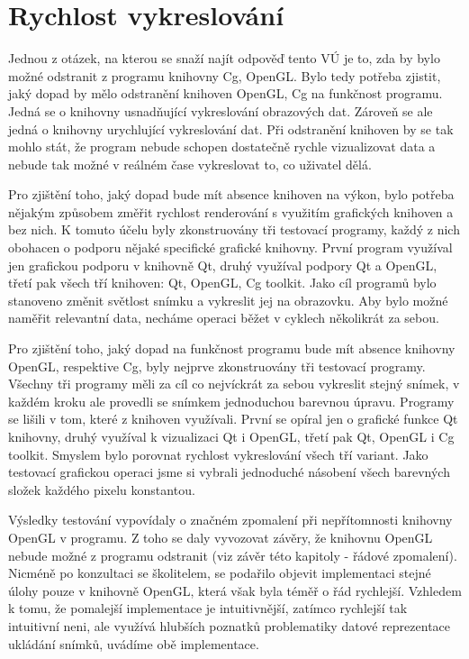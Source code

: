 \section{Rychlost vykreslování}
Jednou z otázek, na kterou se snaží najít odpověď tento VÚ je to, zda by bylo možné odstranit z programu knihovny Cg, OpenGL. Bylo tedy potřeba zjistit, jaký dopad by mělo odstranění knihoven OpenGL, Cg na funkčnost programu. Jedná se o knihovny usnadňující vykreslování obrazových dat. Zároveň se ale jedná o knihovny urychlující vykreslování dat. Při odstranění knihoven by se tak mohlo stát, že program nebude schopen dostatečně rychle vizualizovat data a nebude tak možné v reálném čase vykreslovat to, co uživatel dělá.

Pro zjištění toho, jaký dopad bude mít absence knihoven na výkon, bylo potřeba nějakým způsobem změřit rychlost renderování s využitím grafických knihoven a bez nich. K tomuto účelu byly zkonstruovány tři testovací programy, každý z nich obohacen o podporu nějaké specifické grafické knihovny. První program využíval jen grafickou podporu v knihovně Qt, druhý využíval podpory Qt a OpenGL, třetí pak všech tří knihoven: Qt, OpenGL, Cg toolkit. Jako cíl programů bylo stanoveno změnit světlost snímku a vykreslit jej na obrazovku. Aby bylo možné naměřit relevantní data, necháme operaci běžet v cyklech několikrát za sebou.

Pro zjištění toho, jaký dopad na funkčnost programu bude mít absence knihovny OpenGL, respektive Cg, byly nejprve zkonstruovány tři testovací programy. Všechny tři programy měli za cíl co nejvíckrát za sebou vykreslit stejný snímek, v každém kroku ale provedli se snímkem jednoduchou barevnou úpravu. Programy se lišili v tom, které z knihoven využívali. První se opíral jen o grafické funkce Qt knihovny, druhý využíval k vizualizaci Qt i OpenGL, třetí pak Qt, OpenGL i Cg toolkit. Smyslem bylo porovnat rychlost vykreslování všech tří variant. Jako testovací grafickou operaci jsme si vybrali jednoduché násobení všech barevných složek každého pixelu konstantou.

Výsledky testování vypovídaly o značném zpomalení při nepřítomnosti knihovny OpenGL v programu. Z toho se daly vyvozovat závěry, že knihovnu OpenGL nebude možné z programu odstranit (viz závěr této kapitoly - řádové zpomalení). Nicméně po konzultaci se školitelem, se podařilo objevit implementaci stejné úlohy pouze v knihovně OpenGL, která však byla téměř o řád rychlejší. Vzhledem k tomu, že pomalejší implementace je intuitivnější, zatímco rychlejší tak intuitivní neni, ale využívá hlubších poznatků problematiky datové reprezentace ukládání snímků, uvádíme obě implementace.

